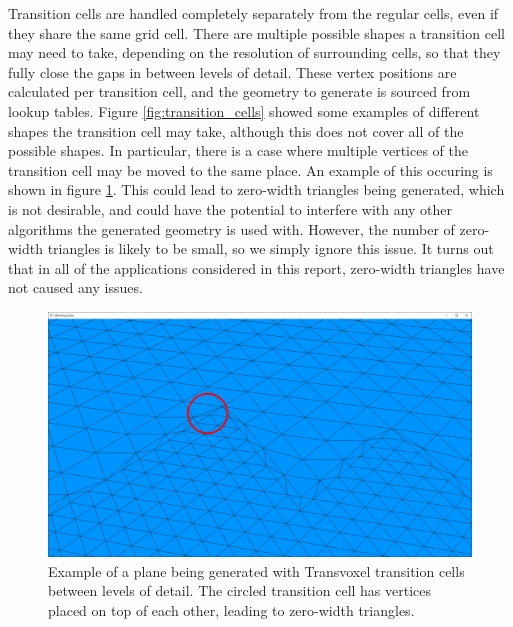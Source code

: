 \documentclass{article}
\begin{document}
\begin{enumerate}
Transition cells are handled completely separately from the regular cells, even if they share the same grid cell. There are multiple possible shapes a transition cell may need to take, depending on the resolution of surrounding cells, so that they fully close the gaps in between levels of detail. These vertex positions are calculated per transition cell, and the geometry to generate is sourced from lookup tables. Figure \ref{fig:transition_cells} showed some examples of different shapes the transition cell may take, although this does not cover all of the possible shapes. In particular, there is a case where multiple vertices of the transition cell may be moved to the same place. An example of this occuring is shown in figure \ref{fig:tv_transition_plane}. This could lead to zero-width triangles being generated, which is not desirable, and could have the potential to interfere with any other algorithms the generated geometry is used with. However, the number of zero-width triangles is likely to be small, so we simply ignore this issue. It turns out that in all of the applications considered in this report, zero-width triangles have not caused any issues.

\begin{figure}[H]
  \includegraphics[width=\textwidth]{tv_transition_plane}
  \caption{Example of a plane being generated with Transvoxel transition cells between levels of detail. The circled transition cell has vertices placed on top of each other, leading to zero-width triangles.}
  \label{fig:tv_transition_plane}
\end{figure}

\end{enumerate}
\end{document}
